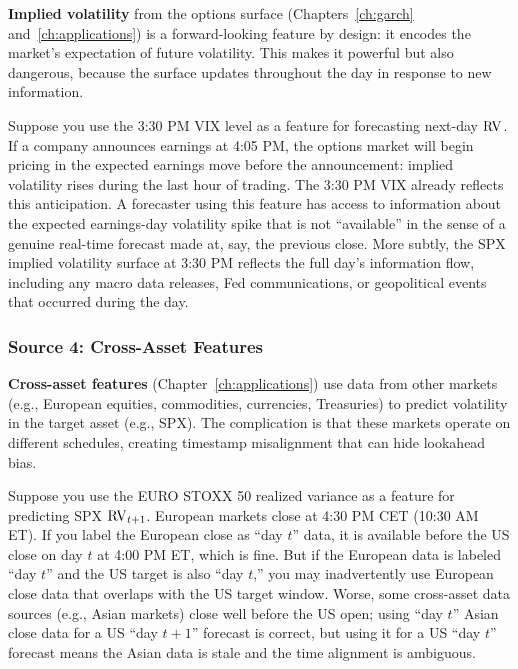 \textbf{Implied volatility} from the options surface (Chapters~\ref{ch:garch} and~\ref{ch:applications}) is a forward-looking feature by design: it encodes the market's expectation of future volatility.
This makes it powerful but also dangerous, because the surface updates throughout the day in response to new information.

\begin{warning}
Suppose you use the 3:30 PM VIX level as a feature for forecasting next-day $\operatorname{RV}$.
If a company announces earnings at 4:05 PM, the options market will begin pricing in the expected earnings move before the announcement: implied volatility rises during the last hour of trading.
The 3:30 PM VIX already reflects this anticipation.
A forecaster using this feature has access to information about the expected earnings-day volatility spike that is not ``available'' in the sense of a genuine real-time forecast made at, say, the previous close.
More subtly, the SPX implied volatility surface at 3:30 PM reflects the full day's information flow, including any macro data releases, Fed communications, or geopolitical events that occurred during the day.
\end{warning}

\subsubsection{Source 4: Cross-Asset Features}

\textbf{Cross-asset features} (Chapter~\ref{ch:applications}) use data from other markets (e.g., European equities, commodities, currencies, Treasuries) to predict volatility in the target asset (e.g., SPX).
The complication is that these markets operate on different schedules, creating timestamp misalignment that can hide lookahead bias.

\begin{warning}
Suppose you use the EURO STOXX 50 realized variance as a feature for predicting SPX $\operatorname{RV}_{t+1}$.
European markets close at 4:30 PM CET (10:30 AM ET).
If you label the European close as ``day $t$'' data, it is available before the US close on day $t$ at 4:00 PM ET, which is fine.
But if the European data is labeled ``day $t$'' and the US target is also ``day $t$,'' you may inadvertently use European close data that overlaps with the US target window.
Worse, some cross-asset data sources (e.g., Asian markets) close well before the US open; using ``day $t$'' Asian close data for a US ``day $t{+}1$'' forecast is correct, but using it for a US ``day $t$'' forecast means the Asian data is stale and the time alignment is ambiguous.
\end{warning}

